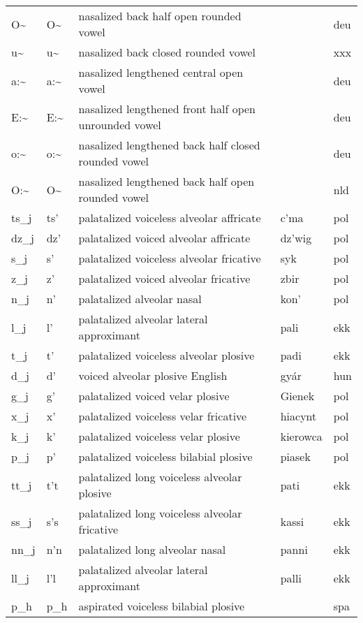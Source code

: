 \begin{longtable}{llp{}ll}
	O\textasciitilde & O\textasciitilde & nasalized back half open rounded vowel & & deu\\
	u\textasciitilde & u\textasciitilde & nasalized back closed rounded vowel & & xxx\\
	a:\textasciitilde & a:\textasciitilde & nasalized lengthened central open vowel & & deu\\
	E:\textasciitilde & E:\textasciitilde & nasalized lengthened front half open unrounded vowel & & deu\\
	o:\textasciitilde & o:\textasciitilde & nasalized lengthened back half closed rounded vowel & & deu\\
	O:\textasciitilde & O\textasciitilde & nasalized lengthened back half open rounded vowel & & nld\\
	ts\_j & ts' & palatalized voiceless alveolar affricate & c'ma & pol\\
	dz\_j & dz' & palatalized voiced alveolar affricate & dz'wig & pol\\
	s\_j & s' & palatalized voiceless alveolar fricative & syk & pol\\
	z\_j & z' & palatalized voiced alveolar fricative & zbir & pol\\
	n\_j & n' & palatalized alveolar nasal & kon' & pol\\
	l\_j & l' & palatalized alveolar lateral approximant & pali & ekk\\
	t\_j & t' & palatalized voiceless alveolar plosive & padi & ekk\\
	d\_j & d' & voiced alveolar plosive English & gyár & hun\\
	g\_j & g' & palatalized voiced velar plosive & Gienek & pol\\
	x\_j & x' & palatalized voiceless velar fricative & hiacynt & pol\\
	k\_j & k' & palatalized voiceless velar plosive & kierowca & pol\\
	p\_j & p' & palatalized voiceless bilabial plosive & piasek & pol\\
	tt\_j & t't & palatalized long voiceless alveolar plosive & pati & ekk\\
	ss\_j & s's & palatalized long voiceless alveolar fricative & kassi & ekk\\
	nn\_j & n'n & palatalized long alveolar nasal & panni & ekk\\
	ll\_j & l'l & palatalized alveolar lateral approximant & palli & ekk\\
	p\_h & p\_h & aspirated voiceless bilabial plosive & & spa\\

\end{longtable}
